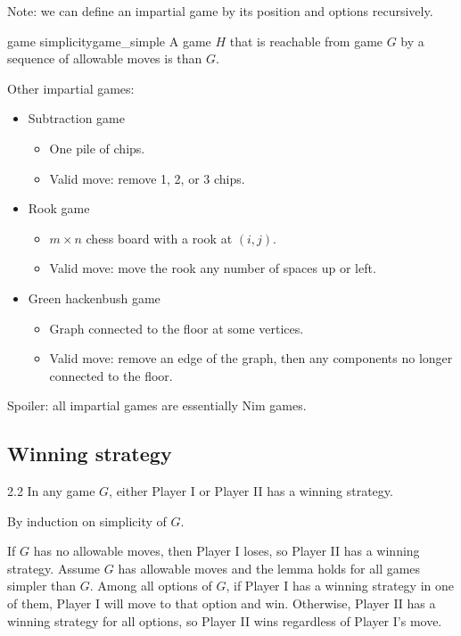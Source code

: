 \documentclass[12pt,letterpaper]{report}
\begin{document}
Note: we can define an impartial game by its position and options recursively.

\begin{defn}{game simplicity}{game_simple}
  A game $H$ that is reachable from game $G$ by a sequence of allowable moves is 
  than $G$.
\end{defn}

\begin{ex}
  Other impartial games:
  \begin{itemize}
    \item
      Subtraction game
      \begin{itemize}
        \item One pile of chips.
        \item Valid move: remove 1, 2, or 3 chips.
      \end{itemize}
    \item
      Rook game
      \begin{itemize}
        \item $m \times n$ chess board with a rook at $(i, j)$.
        \item Valid move: move the rook any number of spaces up or left.
      \end{itemize}
    \item
      Green hackenbush game
      \begin{itemize}
        \item Graph connected to the floor at some vertices.
        \item Valid move: remove an edge of the graph, then any components no longer connected to
          the floor.
      \end{itemize}
  \end{itemize}
\end{ex}

Spoiler: all impartial games are essentially Nim games.

\pagebreak
\subsection{Winning strategy}

\begin{lem}{}{2.2}
  In any game $G$, either Player I or Player II has a winning strategy.
\end{lem}

\begin{thmproof}
  By induction on simplicity of $G$.

  If $G$ has no allowable moves, then Player I loses, so Player II has a winning strategy.
  Assume $G$ has allowable moves and the lemma holds for all games simpler than $G$.
  Among all options of $G$, if Player I has a winning strategy in one of them, Player I will move to
  that option and win.
  Otherwise, Player II has a winning strategy for all options, so Player II wins regardless of
  Player I's move.
\end{thmproof}
\end{document}
